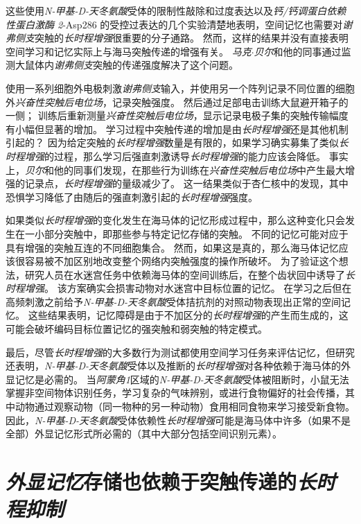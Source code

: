 这些使用\textit{N-甲基-D-天冬氨酸}受体的限制性敲除和过度表达以及\textit{钙/钙调蛋白依赖性蛋白激酶 2}-Asp286 的受控过表达的几个实验清楚地表明，空间记忆也需要对\textit{谢弗侧支}突触的\textit{长时程增强}很重要的分子通路。
然而，这样的结果并没有直接表明空间学习和记忆实际上与海马突触传递的增强有关。
\textit{马克$\cdot$贝尔}和他的同事通过监测大鼠体内\textit{谢弗侧支}突触的传递强度解决了这个问题。


使用一系列细胞外电极刺激\textit{谢弗侧支}输入，并使用另一个阵列记录不同位置的细胞外\textit{兴奋性突触后电位场}，记录突触强度。
然后通过足部电击训练大鼠避开箱子的一侧；
训练后重新测量\textit{兴奋性突触后电位场}，显示记录电极子集的突触传输幅度有小幅但显著的增加。
学习过程中突触传递的增加是由\textit{长时程增强}还是其他机制引起的？
因为给定突触的\textit{长时程增强}数量是有限的，如果学习确实募集了类似\textit{长时程增强}的过程，那么学习后强直刺激诱导\textit{长时程增强}的能力应该会降低。
事实上，\textit{贝尔}和他的同事们发现，在那些行为训练在\textit{兴奋性突触后电位场}中产生最大增强的记录点，\textit{长时程增强}的量级减少了。
这一结果类似于杏仁核中的发现，其中恐惧学习降低了由随后的强直刺激引起的\textit{长时程增强}强度。


如果类似\textit{长时程增强}的变化发生在海马体的记忆形成过程中，那么这种变化只会发生在一小部分突触中，即那些参与特定记忆存储的突触。
不同的记忆可能对应于具有增强的突触互连的不同细胞集合。
然而，如果这是真的，那么海马体记忆应该很容易被不加区别地改变整个网络内突触强度的操作所破坏。
为了验证这个想法，研究人员在水迷宫任务中依赖海马体的空间训练后，在整个齿状回中诱导了\textit{长时程增强}。
该方案确实会损害动物对水迷宫中目标位置的记忆。
在学习之后但在高频刺激之前给予\textit{N-甲基-D-天冬氨酸}受体拮抗剂的对照动物表现出正常的空间记忆。
这些结果表明，记忆障碍是由于不加区分的\textit{长时程增强}的产生而生成的，这可能会破坏编码目标位置记忆的强突触和弱突触的特定模式。


最后，尽管\textit{长时程增强}的大多数行为测试都使用空间学习任务来评估记忆，但研究还表明，\textit{N-甲基-D-天冬氨酸}受体以及推断的\textit{长时程增强}对各种依赖于海马体的外显记忆是必需的。
当\textit{阿蒙角1}区域的\textit{N-甲基-D-天冬氨酸}受体被阻断时，小鼠无法掌握非空间物体识别任务，学习复杂的气味辨别，或进行食物偏好的社会传播，其中动物通过观察动物（同一物种的另一种动物）食用相同食物来学习接受新食物。
因此，\textit{N-甲基-D-天冬氨酸}受体依赖性\textit{长时程增强}可能是海马体中许多（如果不是全部）外显记忆形式所必需的（其中大部分包括空间识别元素）。



\section{\textit{外显记忆}存储也依赖于突触传递的\textit{长时程抑制}}

